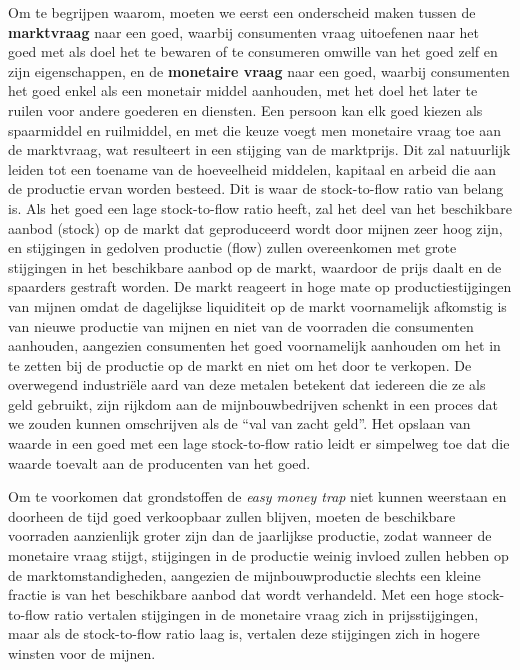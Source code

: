 Om te begrijpen waarom, moeten we eerst een onderscheid maken tussen de \textbf{marktvraag} naar een goed, waarbij consumenten vraag uitoefenen naar het goed met als doel het te bewaren of te consumeren omwille van het goed zelf en zijn eigenschappen, en de \textbf{monetaire vraag} naar een goed, waarbij consumenten het goed enkel als een monetair middel aanhouden, met het doel het later te ruilen voor andere goederen en diensten. Een persoon kan elk goed kiezen als spaarmiddel en ruilmiddel, en met die keuze voegt men monetaire vraag toe aan de marktvraag, wat resulteert in een stijging van de marktprijs. Dit zal natuurlijk leiden tot een toename van de hoeveelheid middelen, kapitaal en arbeid die aan de productie ervan worden besteed. Dit is waar de stock-to-flow ratio van belang is. Als het goed een lage stock-to-flow ratio heeft, zal het deel van het beschikbare aanbod (stock) op de markt dat geproduceerd wordt door mijnen zeer hoog zijn, en stijgingen in gedolven productie (flow) zullen overeenkomen met grote stijgingen in het beschikbare aanbod op de markt, waardoor de prijs daalt en de spaarders gestraft worden. De markt reageert in hoge mate op productiestijgingen van mijnen omdat de dagelijkse liquiditeit op de markt voornamelijk afkomstig is van nieuwe productie van mijnen en niet van de voorraden die consumenten aanhouden, aangezien consumenten het goed voornamelijk aanhouden om het in te zetten bij de productie op de markt en niet om het door te verkopen. De overwegend industriële aard van deze metalen betekent dat iedereen die ze als geld gebruikt, zijn rijkdom aan de mijnbouwbedrijven schenkt in een proces dat we zouden kunnen omschrijven als de ``val van zacht geld''. Het opslaan van waarde in een goed met een lage stock-to-flow ratio leidt er simpelweg toe dat die waarde toevalt aan de producenten van het goed.

Om te voorkomen dat grondstoffen de \textit{easy money trap} niet kunnen weerstaan en doorheen de tijd goed verkoopbaar zullen blijven, moeten de beschikbare voorraden aanzienlijk groter zijn dan de jaarlijkse productie, zodat wanneer de monetaire vraag stijgt, stijgingen in de productie weinig invloed zullen hebben op de marktomstandigheden, aangezien de mijnbouwproductie slechts een kleine fractie is van het beschikbare aanbod dat wordt verhandeld. Met een hoge stock-to-flow ratio vertalen stijgingen in de monetaire vraag zich in prijsstijgingen, maar als de stock-to-flow ratio laag is, vertalen deze stijgingen zich in hogere winsten voor de mijnen.

